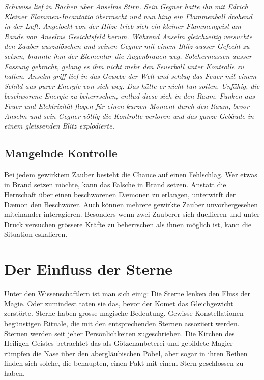 \documentclass[10pt,twoside,twocolumn,openany]{book}
\begin{document}
\begin{quotebox}
	\textit{Schweiss lief in Bächen über Anselms Stirn. Sein Gegner hatte ihn mit Edrich Kleiner Flammen-Incantatio überrascht und nun hing ein Flammenball drohend in der Luft. Angelockt von der Hitze trieb sich ein kleiner Flammengeist am Rande von Anselms Gesichtsfeld herum. Während Anselm gleichzeitig versuchte den Zauber auszulöschen und seinen Gegner mit einem Blitz ausser Gefecht zu setzen, brannte ihm der Elementar die Augenbrauen weg. Solchermassen ausser Fassung gebracht, gelang es ihm nicht mehr den Feuerball unter Kontrolle zu halten. Anselm griff tief in das Gewebe der Welt und schlug das Feuer mit einem Schild aus purer Energie von sich weg. Das hätte er nicht tun sollen. Unfähig, die beschworene Energie zu beherrschen, entlud diese sich in den Raum. Funken aus Feuer und Elektrizität flogen für einen kurzen Moment durch den Raum, bevor Anselm und sein Gegner völlig die Kontrolle verloren und das ganze Gebäude in einem gleissenden Blitz explodierte.
	}
\end{quotebox}

\subsection{Mangelnde Kontrolle}
Bei jedem gewirktem Zauber besteht die Chance auf einen Fehlschlag. Wer etwas in Brand setzen möchte, kann das Falsche in Brand setzen. Anstatt die Herrschaft über einen beschworenen D\ae monen zu erlangen, unterwirft der D\ae mon den Beschwörer. Auch können mehrere gewirkte Zauber unvorhergesehen miteinander interagieren.
Besonders wenn zwei Zauberer sich duellieren und unter Druck versuchen grössere Kräfte zu beherrschen als ihnen möglich ist, kann die Situation eskalieren.

\section{Der Einfluss der Sterne}
Unter den Wissenschaftlern ist man sich einig: Die Sterne lenken den Fluss der Magie. Oder zumindest taten sie das, bevor der Komet das Gleichgewicht zerstörte. Sterne haben grosse magische Bedeutung. Gewisse Konstellationen begünstigen Rituale, die mit den entsprechenden Sternen assoziiert werden. Sternen werden seit jeher Persönlichkeiten zugeschrieben. Die Kirchen des Heiligen Geistes betrachtet das als Götzenanbeterei und gebildete Magier rümpfen die Nase über den abergläubischen Pöbel, aber sogar in ihren Reihen finden sich solche, die behaupten, einen Pakt mit einem Stern geschlossen zu haben. 
\end{document}
